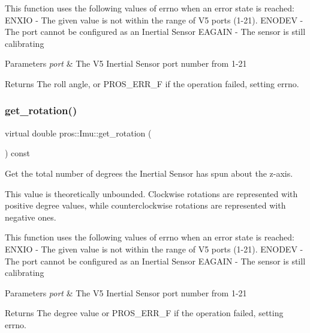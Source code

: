This function uses the following values of errno when an error state is reached\+: E\+N\+X\+IO -\/ The given value is not within the range of V5 ports (1-\/21). E\+N\+O\+D\+EV -\/ The port cannot be configured as an Inertial Sensor E\+A\+G\+A\+IN -\/ The sensor is still calibrating


\begin{DoxyParams}{Parameters}
{\em port} & The V5 Inertial Sensor port number from 1-\/21 \\
\hline
\end{DoxyParams}
\begin{DoxyReturn}{Returns}
The roll angle, or P\+R\+O\+S\+\_\+\+E\+R\+R\+\_\+F if the operation failed, setting errno. 
\end{DoxyReturn}
\mbox{\label{classpros_1_1Imu_ac8bd7a19a6b4fc0c207a895efd3f0b48}} 
\subsubsection{\texorpdfstring{get\+\_\+rotation()}{get\_rotation()}}
{\footnotesize\ttfamily virtual double pros\+::\+Imu\+::get\+\_\+rotation (\begin{DoxyParamCaption}{ }\end{DoxyParamCaption}) const\hspace{0.3cm}{\ttfamily [virtual]}}



Get the total number of degrees the Inertial Sensor has spun about the z-\/axis. 

This value is theoretically unbounded. Clockwise rotations are represented with positive degree values, while counterclockwise rotations are represented with negative ones.

This function uses the following values of errno when an error state is reached\+: E\+N\+X\+IO -\/ The given value is not within the range of V5 ports (1-\/21). E\+N\+O\+D\+EV -\/ The port cannot be configured as an Inertial Sensor E\+A\+G\+A\+IN -\/ The sensor is still calibrating


\begin{DoxyParams}{Parameters}
{\em port} & The V5 Inertial Sensor port number from 1-\/21 \\
\hline
\end{DoxyParams}
\begin{DoxyReturn}{Returns}
The degree value or P\+R\+O\+S\+\_\+\+E\+R\+R\+\_\+F if the operation failed, setting errno. 
\end{DoxyReturn}
\mbox{\label{classpros_1_1Imu_ad38c8f55b89f8d2e7b68a6bda0029559}} 
